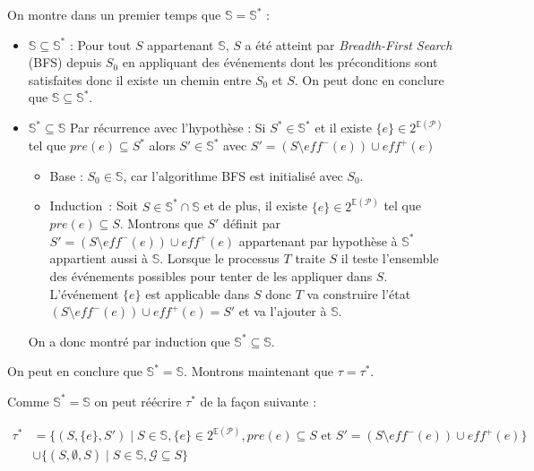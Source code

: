 On montre dans un premier temps que $\mathds{S} = \mathds{S}^*$ :
\begin{itemize}
    \item $\mathds{S} \subseteq \mathds{S}^*$ : Pour tout $S$ appartenant $\mathds{S}$, $S$ a été atteint par \textit{Breadth-First Search} (BFS) depuis $S_0$ en appliquant des événements dont les préconditions sont satisfaites donc il existe un chemin entre $S_0$ et $S$. On peut donc en conclure que $\mathds{S} \subseteq \mathds{S}^*$.
    \item $\mathds{S}^* \subseteq \mathds{S}$ Par récurrence avec l'hypothèse : Si $S^* \in \mathds{S}^*$ et il existe $\{e\}\in 2^{\mathds{E}(\mathcal{P})}$ tel que $pre(e) \subseteq S^*$ alors $S'\in \mathds{S}^*$ avec $S' = (S \setminus eff^-(e)) \cup eff^+(e)$
    \begin{itemize}
        \item Base : $S_0 \in \mathds{S}$, car l'algorithme BFS est initialisé avec $S_0$.
        \item  Induction : Soit $S \in \mathds{S}^* \cap \mathds{S}$  et de plus, il existe $\{e\} \in 2^{\mathds{E}(\mathcal{P})}$ tel que $pre(e) \subseteq S$. Montrons que $S'$ définit par  $S' = (S \setminus eff^-(e)) \cup eff^+(e)$ appartenant par hypothèse à $\mathds{S}^*$ appartient aussi à $\mathds{S}$. Lorsque le processus $T$ traite $S$ il teste l'ensemble des événements possibles pour tenter de les appliquer dans $S$. L'événement  $\{e\}$ est applicable dans $S$ donc $T$ va construire l'état $(S \setminus eff^-(e)) \cup eff^+(e) = S'$ et va l'ajouter à $\mathds{S}$.
    \end{itemize}
    On a donc montré par induction que $\mathds{S}^* \subseteq \mathds{S}$.
\end{itemize}
On peut en conclure que $\mathds{S}^* = \mathds{S}$. Montrons maintenant que $\tau = \tau^*$.

Comme $\mathds{S}^* = \mathds{S}$ on peut réécrire $\tau^*$ de la façon suivante :


\begin{equation*}
    \begin{aligned}
    \tau^* &= \{(S, \{e\}, S') \mid S \in \mathbb{S}, \{e\} \in 2^{\mathds{E}(\mathcal{P})}, pre(e) \subseteq S \text{ et } S' = (S \setminus eff^-(e)) \cup eff^+(e)\} \\
    &\cup \{(S, \emptyset, S) \mid S \in \mathds{S}, \mathcal{G} \subseteq S\}
    \end{aligned}
\end{equation*}


